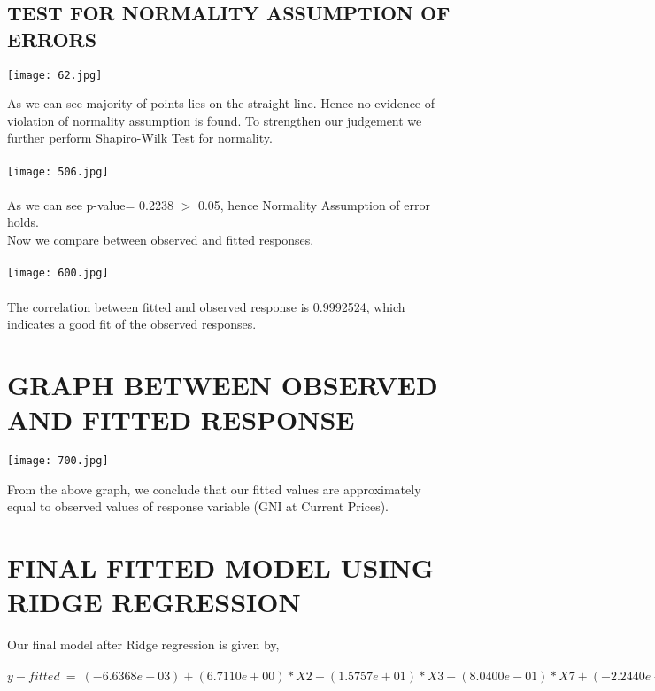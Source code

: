 \documentclass[a4paper,12pt,twoside]{book}
\begin{document}
\subsection*{TEST FOR NORMALITY ASSUMPTION OF ERRORS}
\begin{center}
\texttt{[image: 62.jpg]}\\
\end{center}
As we can see majority of points lies on the straight line. Hence no evidence of violation of normality assumption is found. To strengthen our judgement we further perform Shapiro-Wilk Test for normality.\\\\
\texttt{[image: 506.jpg]}\\\\
As we can see p-value= 0.2238 $>$ 0.05, hence Normality Assumption of error holds.\\
Now we compare between observed and fitted responses.\\\\
\texttt{[image: 600.jpg]}\\\\
The correlation between fitted and observed response is 0.9992524, which indicates a good fit of the observed responses.
\section{GRAPH BETWEEN OBSERVED AND FITTED RESPONSE}
\begin{center}
\texttt{[image: 700.jpg]}\\
\end{center}
From the above graph, we conclude that our fitted values are approximately equal to observed values of response variable (GNI at Current Prices).\\
\section*{FINAL FITTED MODEL USING RIDGE REGRESSION}
Our final model after Ridge regression is given by,\\\\
$y-fitted\:=\:(-6.6368e+03)+(6.7110e+00)*X2+(1.5757e+01)*X3+
  (8.0400e-01)*X7+(-2.2440e-01)*X8+(-1.6076e+00)*X9+
  (5.4510e-01)*X10+(4.7750e-01)*X11+(4.2570e-01)*X12+
  (9.6460e-01)*X13+(1.9040e-01)*X14+(6.6090e-01)*X15+
  (4.4430e-01)*X16+(2.5200e-01)*X18+(5.5850e-01)*X20$
\end{document}
